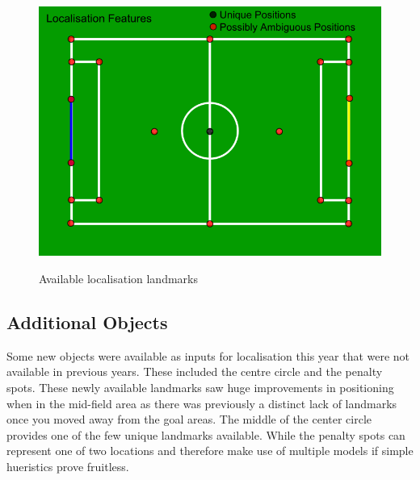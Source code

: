 \begin{figure}[htpb]
\begin{center}
   \leavevmode
    \scalebox{0.5} {\includegraphics{figs/LocalisationPoints.png} }
    \caption{Available localisation landmarks}
    \label{fig:LocalisationPoints}
\end{center}
\end{figure}

\subsection{Additional Objects}
Some new objects were available as inputs for localisation this year that were not available in previous years. These included the centre circle and the penalty spots. These newly available landmarks saw huge improvements in positioning when in the mid-field area as there was previously a distinct lack of landmarks once you moved away from the goal areas. The middle of the center circle provides one of the few unique landmarks available. While the penalty spots can represent one of two locations and therefore make use of multiple models if simple hueristics prove fruitless.
